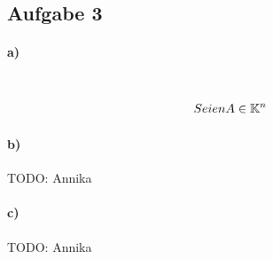\subsection*{Aufgabe 3}
\paragraph*{a)}\\
\begin{align}
Seien A \in \mathbb K^n
\end{align}

\paragraph*{b)}
TODO: Annika

\paragraph*{c)}
TODO: Annika